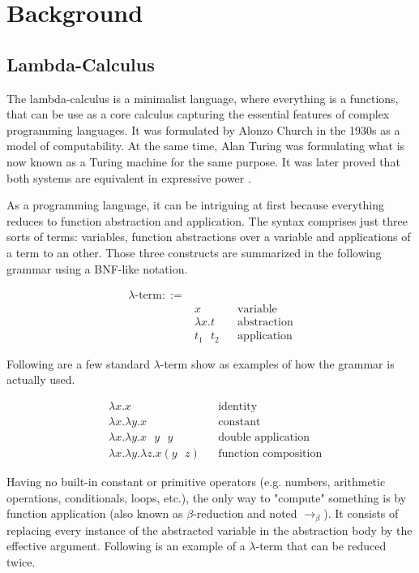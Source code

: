 \chapter{Background}
\label{sec:background}

\section{Lambda-Calculus}
\label{sec:background-lambda-calculus}

The lambda-calculus is a minimalist language, where everything is a functions, that can be use as a
core calculus capturing the essential features of complex programming languages. It was formulated
by Alonzo Church \cite{???} in the 1930s as a model of computability. At the same time, Alan Turing
was formulating what is now known as a Turing machine \cite{???} for the same purpose. It was later
proved that both systems are equivalent in expressive power \cite{???}.

As a programming language, it can be intriguing at first because everything reduces to function
abstraction and application. The syntax comprises just three sorts of terms: variables, function
abstractions over a variable and applications of a term to an other. Those three constructs are
summarized in the following grammar using a BNF-like notation.

\begin{align*}
  \lambda\text{-term} ::= & \\
    & x && \text{variable} \\
    & \lambda x. t && \text{abstraction} \\
    & t_1 \text{ } t_2 && \text{application}
\end{align*}

Following are a few standard $\lambda$-term show as examples of how the grammar is actually used.

\begin{align*}
  & \lambda x. x && \text{identity} \\
  & \lambda x. \lambda y. x && \text{constant} \\
  & \lambda x. \lambda y. x \text{ } y \text{ } y && \text{double application} \\
  & \lambda x. \lambda y. \lambda z. x (y \text{ } z) && \text{function composition}
\end{align*}

Having no built-in constant or primitive operators (e.g. numbers, arithmetic operations,
conditionals, loops, etc.), the only way to "compute" something is by function application (also
known as $\beta$-reduction and noted $\to_\beta$). It consists of replacing every instance of the
abstracted variable in the abstraction body by the effective argument. Following is an example of a
$\lambda$-term that can be reduced twice.


